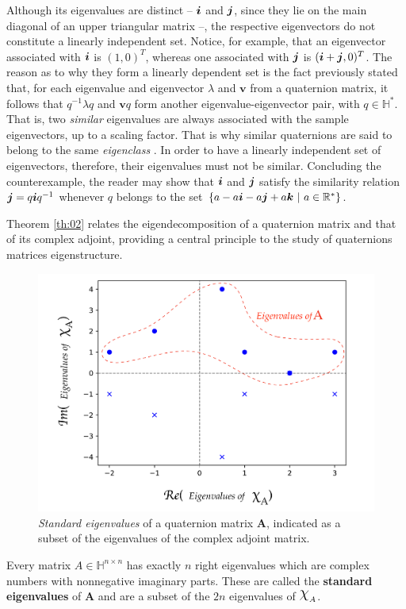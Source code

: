 Although its eigenvalues are distinct -- $ \boldsymbol{i} $ and $ \boldsymbol{j} $, since they lie on the main diagonal of an upper triangular matrix --, the respective eigenvectors do not constitute a linearly independent set. Notice, for example, that an eigenvector associated with $ \boldsymbol{i} $ is $ (1, 0)^T $, whereas one associated with $ \boldsymbol{j} $ is $ (\boldsymbol{i} + \boldsymbol{j}, 0)^T $. The reason as to why they form a linearly dependent set is the fact previously stated that, for each eigenvalue and eigenvector $ \lambda $ and $ \mathbf{v} $ from a quaternion matrix, it follows that $ q^{-1}\lambda q $ and $ \mathbf{v}q $ form another eigenvalue-eigenvector pair, with $ q \in \mathbb{H}^\ast $. That is, two \emph{similar} eigenvalues are always associated with the sample eigenvectors, up to a scaling factor. That is why similar quaternions are said to belong to the same \emph{eigenclass} \cite{de2000right}. In order to have a linearly independent set of eigenvectors, therefore, their eigenvalues must not be similar. Concluding the counterexample, the reader may show that $ \boldsymbol{i} $ and $ \boldsymbol{j} $ satisfy the similarity relation $ \boldsymbol{j} = q \boldsymbol{i} q^{-1} $ whenever $q$ belongs to the set $ \{ a - a\boldsymbol{i} - a\boldsymbol{j} + a\boldsymbol{k} \ | \ a\in \mathbb{R}^\ast \} $.

Theorem \ref{th:02} relates the eigendecomposition of a quaternion matrix and that of its complex adjoint, providing a central principle to the study of quaternions matrices eigenstructure.

\begin{figure}
\centering
\includegraphics[width=0.6\linewidth]{Figures/complex_adjoint_eigvals_EN.pdf}
\caption{\emph{Standard eigenvalues} of a quaternion matrix $ \mathbf{A} $, indicated as a subset of the eigenvalues of the complex adjoint matrix.}
\end{figure}


\begin{theorem}
\label{th:02}
Every matrix $ A \in \mathbb{H}^{n \times n} $ has exactly $ n $ right eigenvalues which are complex numbers with nonnegative imaginary parts. These are called the \textbf{standard eigenvalues} of $ \mathbf{A} $ and are a subset of the $ 2n $ eigenvalues of $ \rchi_A $.
\end{theorem}

